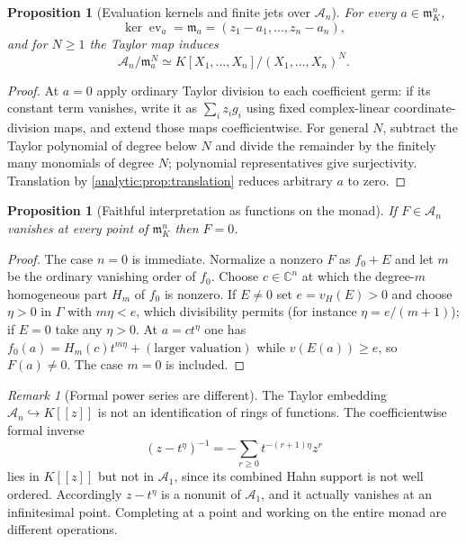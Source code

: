 \documentclass[11pt,letterpaper]{article}
\newtheorem{proposition}[theorem]{Proposition}
\theoremstyle{definition}
\theoremstyle{remark}
\newtheorem{remark}[theorem]{Remark}
\newcommand{\C}{\mathbb C}
\newcommand{\A}{\mathscr A}
\newcommand{\m}{\mathfrak m}
\newcommand{\ev}{\operatorname{ev}}
\newcommand{\vH}{v_{\!H}}
\numberwithin{equation}{section}
\begin{document}
\begin{proposition}[Evaluation kernels and finite jets over $\A_n$]
\label{analytic:prop:kernels}
For every $a\in\m_K^n$,
\begin{equation}\label{analytic:eq:kernel}
 \ker\ev_a=\m_a=(z_1-a_1,\ldots,z_n-a_n),
\end{equation}
and for $N\ge1$ the Taylor map induces
\begin{equation}\label{analytic:eq:jets}
 \A_n/\m_a^N\simeq K[X_1,\ldots,X_n]/(X_1,\ldots,X_n)^N.
\end{equation}
\end{proposition}
\begin{proof}
At $a=0$ apply ordinary Taylor division to each coefficient germ: if its
constant term vanishes, write it as $\sum_iz_ig_i$ using fixed
complex-linear coordinate-division maps, and extend those maps
coefficientwise. For general $N$, subtract the Taylor polynomial of degree
below $N$ and divide the remainder by the finitely many monomials of degree
$N$; polynomial representatives give surjectivity. Translation by
\cref{analytic:prop:translation} reduces arbitrary $a$ to zero.
\end{proof}

\begin{proposition}[Faithful interpretation as functions on the monad]
\label{analytic:prop:faithful}
If $F\in\A_n$ vanishes at every point of $\m_K^n$ then $F=0$.
\end{proposition}
\begin{proof}
The case $n=0$ is immediate. Normalize a nonzero $F$ as $f_0+E$ and let $m$
be the ordinary vanishing order of $f_0$. Choose $c\in\C^n$ at which the
degree-$m$ homogeneous part $H_m$ of $f_0$ is nonzero. If $E\ne0$ set
$e=\vH(E)>0$ and choose $\eta>0$ in $\Gamma$ with $m\eta<e$, which
divisibility permits (for instance $\eta=e/(m+1)$); if $E=0$ take any
$\eta>0$. At $a=ct^\eta$ one has
$f_0(a)=H_m(c)t^{m\eta}+(\text{larger valuation})$ while $v(E(a))\ge e$, so
$F(a)\ne0$. The case $m=0$ is included.
\end{proof}

\begin{remark}[Formal power series are different]
\label{analytic:rem:formal-distinction}
The Taylor embedding $\A_n\hookrightarrow K[[z]]$ is not an identification
of rings of functions. The coefficientwise formal inverse
\[
 (z-t^\eta)^{-1}=-\sum_{r\ge0}t^{-(r+1)\eta}z^r
\]
lies in $K[[z]]$ but not in $\A_1$, since its combined Hahn support is not
well ordered. Accordingly $z-t^\eta$ is a nonunit of $\A_1$, and it actually
vanishes at an infinitesimal point. Completing at a point and working on the
entire monad are different operations.
\end{remark}
\end{document}
